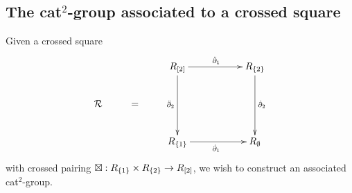 \subsection{The cat$^2$-group associated to a crossed square} 
\label{sect:cat2-xsq}


Given a crossed square
\begin{equation} \label{eq:RsquareR}
\vcenter{\xymatrix{
        &   &    R_{[2]} \ar[rr]^{\ddbdyo} \ar[dd]_{\ddbdyt}
             &&  R_{\{2\}} \ar[dd]^{\dbdyt} \\
  \calR & = &&&  \\
        &   &    R_{\{1\}} \ar[rr]_{\dbdyo}
             &&  R_{\emptyset}
}}
\end{equation}
with crossed pairing $\boxtimes: R_{\{1\}} \times R_{\{2\}} \to R_{[2]}$, 
we wish to construct an associated cat$^2$-group.


